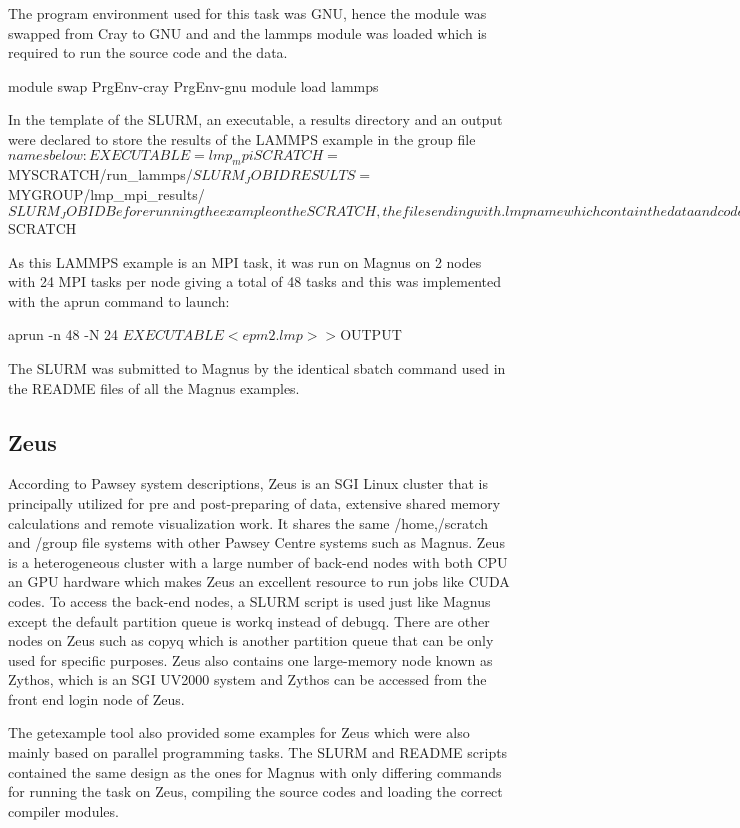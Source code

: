 \documentclass[journal]{IEEEtran}
\begin{document}
The program environment used for this task was GNU, hence the module was swapped from Cray to GNU and and the lammps module was loaded which is required
to run the source code and the data.

module swap PrgEnv-cray PrgEnv-gnu
module load lammps

In the template of the SLURM, an executable, a results directory and an output were declared to store the results of the LAMMPS example in the group file$
names below:

EXECUTABLE=lmp_mpi
SCRATCH=$MYSCRATCH/run_lammps/$SLURM_JOBID
RESULTS=$MYGROUP/lmp_mpi_results/$SLURM_JOBID

Before running the example on the SCRATCH, the files ending with .lmp name which contain the data and code were copied to the SCRACTH and this was
obtained in the SLURM as:

cp *.lmp $SCRATCH

As this LAMMPS example is an MPI task, it was run on Magnus on 2 nodes with 24 MPI tasks per node giving a total of 48 tasks and this was implemented
with the aprun command to launch:

aprun -n 48 -N 24 $EXECUTABLE < epm2.lmp >> ${OUTPUT}

The SLURM was submitted to Magnus by the identical sbatch command used in the README files of all the Magnus examples.


\subsection{Zeus}

According to Pawsey system descriptions, Zeus is an SGI Linux cluster that is principally utilized for pre and post-preparing of data, extensive shared 
memory calculations and remote visualization work. It shares the same /home,/scratch and /group file systems with other Pawsey Centre systems such as 
Magnus. Zeus is a heterogeneous cluster with a large number of back-end nodes with both CPU an GPU hardware which makes Zeus an excellent resource to run
jobs like CUDA codes. To access the back-end nodes, a SLURM script is used just like Magnus except the default partition queue is workq instead of 
debugq. There are other nodes on Zeus such as copyq which is another partition queue that can be only used for specific purposes. Zeus also contains one 
large-memory node known as Zythos, which is an SGI UV2000 system and Zythos can be accessed from the front end login node of
Zeus. 

The getexample tool also provided some examples for Zeus which were also mainly based on parallel programming tasks. The SLURM and README scripts
contained the same design as the ones for Magnus with only differing commands for running the task on Zeus, compiling the source codes and loading the
correct compiler modules. 
 
\end{document}
